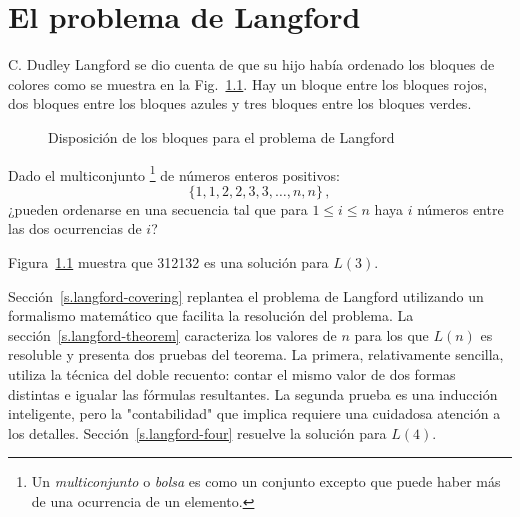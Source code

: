 
\chapter{El problema de Langford}\label{c.langford}


C. Dudley Langford se dio cuenta de que su hijo había ordenado los bloques de colores como se muestra en la Fig.~\ref{f.langford}.
Hay un bloque entre los bloques rojos, dos bloques entre los bloques azules y tres bloques entre los bloques verdes. 

\begin{figure}[ht]
\begin{center}
\end{center}
\caption{Disposición de los bloques para el problema de Langford}\label{f.langford}
\end{figure}

\begin{definition} Dado el multiconjunto \footnote{Un \emph{multiconjunto} o \emph{bolsa} es como un conjunto excepto que puede haber más de una ocurrencia de un elemento.} de números enteros positivos:
\[
\{1,1,2,2,3,3,\ldots,n,n\}\,,
\]
¿pueden ordenarse en una secuencia tal que para $1\leq i \leq n$ haya $i$ números entre las dos ocurrencias de $i$?
\end{definition}

Figura~\ref{f.langford} muestra que 312132 es una solución para $L(3)$.

Sección~\ref{s.langford-covering} replantea el problema de Langford utilizando un formalismo matemático que facilita la resolución del problema. La sección~\ref{s.langford-theorem} caracteriza los valores de $n$ para los que $L(n)$ es resoluble y presenta dos pruebas del teorema. La primera, relativamente sencilla, utiliza la técnica del doble recuento: contar el mismo valor de dos formas distintas e igualar las fórmulas resultantes. La segunda prueba es una inducción inteligente, pero la "contabilidad" que implica requiere una cuidadosa atención a los detalles. Sección~\ref{s.langford-four} resuelve la solución para $L(4)$.

